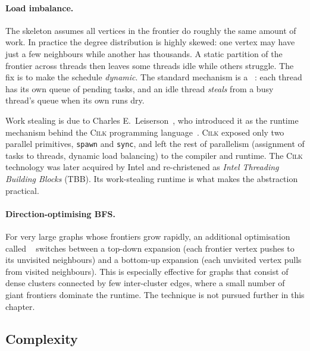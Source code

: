 \paragraph{Load imbalance.}
The skeleton assumes all vertices in the frontier do roughly the same
amount of work.  In practice the degree distribution is highly skewed:
one vertex may have just a few neighbours while another has thousands.
A static partition of the frontier across threads then leaves some
threads idle while others struggle.  The fix is to make the schedule
\emph{dynamic}.  The standard mechanism is a ~\cite{blumofe1999}: each thread has its own queue of pending tasks, and an idle
thread \emph{steals} from a busy thread's queue when its own runs dry.

\begin{ppnote}
Work stealing is due to Charles E.~Leiserson~\cite{blumofe1999}, who introduced it as the
runtime mechanism behind the \textsc{Cilk} programming language~\cite{frigo1998cilk}.
\textsc{Cilk} exposed only two parallel primitives, \texttt{spawn} and
\texttt{sync}, and left the rest of parallelism (assignment of tasks to
threads, dynamic load balancing) to the compiler and runtime.  The
\textsc{Cilk} technology was later acquired by Intel and re-christened
as \emph{Intel Threading Building Blocks} (TBB).  Its work-stealing
runtime is what makes the abstraction practical.
\end{ppnote}

\paragraph{Direction-optimising BFS.}
For very large graphs whose frontiers grow rapidly, an additional optimisation called ~\cite{beamer2012} switches between
a top-down expansion (each frontier vertex pushes to its unvisited
neighbours) and a bottom-up expansion (each unvisited vertex pulls from
visited neighbours).  This is especially effective for graphs that
consist of dense clusters connected by few inter-cluster edges, where a
small number of giant frontiers dominate the runtime.  The technique is
not pursued further in this chapter.

\subsection{Complexity}

